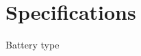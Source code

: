 \section{Specifications}
\begin{table}
	\begin{tabular}[ll]
	\item Battery type
	\end{tabular}
\end{table}
